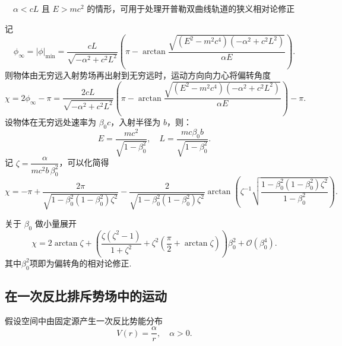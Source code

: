 \begin{example}
	\(\quad\alpha < cL\) 且 \(E > mc^2\) 的情形，可用于处理开普勒双曲线轨道的狭义相对论修正

	记
	\begin{equation*}
		\phi_{\infty} = |\phi|_{\text{min}} = \dfrac{cL}{\sqrt{-\alpha^2 + c^2 L^2}} \left(\pi - \arctan \dfrac{\sqrt{(E^2 - m^2 c^4) (-\alpha^2 + c^2 L^2)}}{\alpha E}\right).
	\end{equation*}
	则物体由无穷远入射势场再出射到无穷远时，运动方向向力心将偏转角度
	\begin{equation*}
		\chi = 2 \phi_{\infty} - \pi = \dfrac{2 cL}{\sqrt{-\alpha^2 + c^2 L^2}} \left(\pi - \arctan \dfrac{\sqrt{(E^2 - m^2 c^4) (-\alpha^2 + c^2 L^2)}}{\alpha E}\right) - \pi.
	\end{equation*}
	设物体在无穷远处速率为 \(\beta_0 c\)，入射半径为 \(b\)，则：
	\begin{equation*}
		E = \dfrac{mc^2}{\sqrt{1 - \beta_0^2}}, \quad
		L = \dfrac{mc \beta_0 b}{\sqrt{1 - \beta_0^2}}.
	\end{equation*}
	记 \(\zeta = \dfrac{\alpha}{mc^2 b\, \beta_0^2}\)，可以化简得
	\begin{equation*}
		\chi = -\pi + \dfrac{2 \pi}{\sqrt{1 - \beta_0^2 (1 - \beta_0^2) \zeta^2}} - \dfrac{2}{\sqrt{1 - \beta_0^2 (1 - \beta_0^2) \zeta^2}} \arctan \left(\zeta^{-1} \sqrt{\dfrac{1 - \beta_0^2 (1 - \beta_0^2) \zeta^2}{1 - \beta_0^2}}\right).
	\end{equation*}

	关于 \(\beta_0\) 做小量展开
	\begin{equation*}
		\chi = 2 \arctan\zeta + \left( \dfrac{\zeta (\zeta^2 - 1)}{1 + \zeta^2} + \zeta^2 \left( \dfrac{\pi}{2} + \arctan\zeta \right) \right) \beta_0^2 + \mathcal{O} (\beta_0^4).
	\end{equation*}
	其中\(\beta_0^2\)项即为偏转角的相对论修正.
\end{example}

\subsection{在一次反比排斥势场中的运动}
假设空间中由固定源产生一次反比势能分布
\begin{equation*}
	V(r) = \dfrac{\alpha}{r}, \quad \alpha > 0.
\end{equation*}

